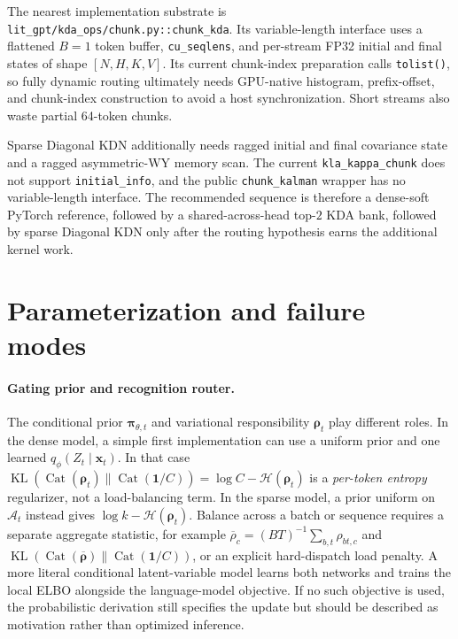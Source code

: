 \documentclass[11pt]{article}
\newcommand{\ve}[1]{\boldsymbol{#1}}
\newcommand{\KL}{\operatorname{KL}}
\newcommand{\Cat}{\operatorname{Cat}}
\begin{document}
The nearest implementation substrate is
\texttt{lit\_gpt/kda\_ops/chunk.py::chunk\_kda}.  Its variable-length interface uses a flattened
$B=1$ token buffer, \texttt{cu\_seqlens}, and per-stream FP32 initial and final states of shape
$[N,H,K,V]$.  Its current chunk-index preparation calls
\texttt{tolist()}, so fully dynamic routing ultimately needs GPU-native histogram, prefix-offset,
and chunk-index construction to avoid a host synchronization.  Short streams also waste partial
64-token chunks.

Sparse Diagonal KDN additionally needs ragged initial and final covariance state and a ragged
asymmetric-WY memory scan.  The current \texttt{kla\_kappa\_chunk} does not support
\texttt{initial\_info}, and the public \texttt{chunk\_kalman} wrapper has no variable-length
interface.  The recommended sequence is therefore a dense-soft PyTorch reference, followed by a
shared-across-head top-$2$ KDA bank, followed by sparse Diagonal KDN only after the routing
hypothesis earns the additional kernel work.

\section{Parameterization and failure modes}
\label{sec:kdn3-parameterization}

\paragraph{Gating prior and recognition router.}
The conditional prior $\ve{\pi}_{\theta,t}$ and variational responsibility $\ve{\rho}_t$ play
different roles.  In the dense model, a simple first implementation can use a uniform prior and
one learned $q_{\phi}(Z_t\mid\ve{x}_t)$.  In that case
$\KL(\Cat(\ve{\rho}_t)\|\Cat(\ve{1}/C))=\log C-\mathcal{H}(\ve{\rho}_t)$ is a
\emph{per-token entropy} regularizer, not a load-balancing term.  In the sparse model, a prior
uniform on $\mathcal{A}_t$ instead gives $\log k-\mathcal{H}(\ve{\rho}_t)$.  Balance across a batch
or sequence requires a separate aggregate statistic, for example
$\overline\rho_c=(BT)^{-1}\sum_{b,t}\rho_{bt,c}$ and
$\KL(\Cat(\overline{\ve{\rho}})\|\Cat(\ve{1}/C))$, or an explicit hard-dispatch load penalty.
A more literal conditional latent-variable model learns both networks and trains the local ELBO
alongside the language-model objective.  If no such objective is used, the probabilistic
derivation still specifies the update but should be described as motivation rather than optimized
inference.
\end{document}
